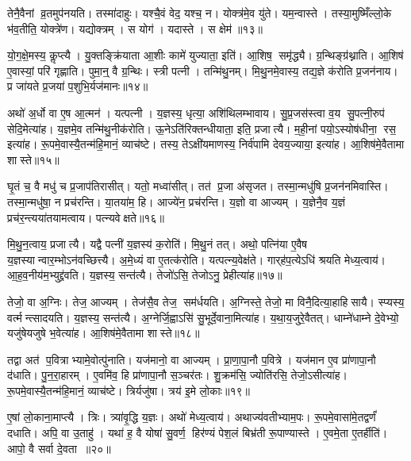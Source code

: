 तेनै॒वैनां व्र॒तमुप॑नयति।
तस्मा॑दाहुः।
यश्चै॒वं वेद॒ यश्च॒ न।
योक्त्र॑मे॒व यु॑ते।
यम॒न्वास्ते।
तस्या॒मुष्मिँल्लो॒के भ॑व॒तीति॒ योक्त्रे॑ण।
यद्योक्त्रम्।
स योग॑।
यदास्ते।
स क्षेम॑॥१३॥

यो॒ग॒क्षे॒मस्य॒ कॢप्त्यै।
यु॒क्तङ्क्रि॑याता आ॒शीः कामे॑ युज्याता॒ इति॑।
आ॒शिष॒ समृ॑द्ध्यै।
ग्र॒न्थिङ्ग्र॑थ्नाति।
आ॒शिष॑ ए॒वास्यां॒ परि॑ गृह्णाति।
पुमा॒न्॒ वै ग्र॒न्थिः।
स्त्री पत्नी।
तन्मि॑थु॒नम्।
मि॒थु॒नमे॒वास्य॒ तद्य॒ज्ञे क॑रोति प्र॒जन॑नाय।
प्र जा॑यते प्र॒जया॑ प॒शुभि॒र्यज॑मानः॥१४॥

अथो॑ अ॒र्धो वा ए॒ष आ॒त्मन॑।
यत्पत्नी।
य॒ज्ञस्य॒ धृत्या॒ अशि॑थिलम्भावाय।
सु॒प्र॒जस॑स्त्वा व॒य सु॒पत्नी॒रुप॑ सेदि॒मेत्या॑ह।
य॒ज्ञमे॒व तन्मि॑थु॒नीक॑रोति।
ऊ॒नेऽति॑रिक्तन्धीयाता॒ इति॒ प्रजात्यै।
म॒ही॒नां पयो॒ऽस्योष॑धीना॒ रस॒ इत्या॑ह।
रू॒पमे॒वास्यै॒तन्म॑हि॒मानं॒ व्याच॑ष्टे।
तस्य॒ तेऽक्षी॑यमाणस्य॒ निर्व॑पामि देवय॒ज्याया॒ इत्या॑ह।
आ॒शिष॑मे॒वैतामा शास्ते॥१५॥\anuvakamend[क॒रोति॑ व्रतोप॒नय॑नं॒ क्षेमो॒ यज॑मानः शास्ते]

घृ॒तं च॒ वै मधु॑ च प्र॒जाप॑तिरासीत्।
यतो॒ मध्वा॑सीत्।
तत॑ प्र॒जा अ॑सृजत।
तस्मा॒न्मधु॑षि प्र॒जन॑नमिवास्ति।
तस्मा॒न्मधु॑षा॒ न प्रच॑रन्ति।
या॒तया॑म॒ हि।
आज्ये॑न॒ प्रच॑रन्ति।
य॒ज्ञो वा आज्यम्।
य॒ज्ञेनै॒व य॒ज्ञं प्रच॑र॒न्त्यया॑तयामत्वाय।
पत्न्यवेक्षते॥१६॥

मि॒थु॒न॒त्वाय॒ प्रजात्यै।
यद्वै पत्नी॑ य॒ज्ञस्य॑ क॒रोति॑।
मि॒थु॒नं तत्।
अथो॒ पत्नि॑या ए॒वैष य॒ज्ञस्यान्वार॒म्भोऽन॑वच्छित्त्यै।
अ॒मे॒ध्यं वा ए॒तत्क॑रोति।
यत्पत्न्य॒वेक्ष॑ते।
गार्‌ह॑प॒त्येऽधि॑ श्रयति मेध्य॒त्वाय॑।
आ॒ह॒व॒नीय॑म॒भ्युद्द्र॑वति।
य॒ज्ञस्य॒ सन्त॑त्यै।
तेजो॑ऽसि॒ तेजोऽनु॒ प्रेहीत्या॑ह॥१७॥

तेजो॒ वा अ॒ग्निः।
तेज॒ आज्यम्।
तेज॑सै॒व तेज॒ सम॑र्धयति।
अ॒ग्निस्ते॒ तेजो॒ मा विनै॒दित्या॒हाहिसायै।
स्प्यस्य॒ वर्त्मन्त्सादयति।
य॒ज्ञस्य॒ सन्त॑त्यै।
अ॒ग्नेर्जि॒ह्वाऽसि॑ सु॒भूर्दे॒वाना॒मित्या॑ह।
य॒था॒य॒जुरे॒वैतत्।
धाम्ने॑धाम्ने दे॒वेभ्यो॒ यजु॑षेयजुषे भ॒वेत्या॑ह।
आ॒शिष॑मे॒वैतामा शास्ते॥१८॥

तद्वा अत॑ प॒वित्राभ्यामे॒वोत्पु॑नाति।
यज॑मानो॒ वा आज्यम्।
प्रा॒णा॒पा॒नौ प॒वित्रे।
यज॑मान ए॒व प्रा॑णापा॒नौ द॑धाति।
पु॒न॒रा॒हारम्।
ए॒वमि॑व॒ हि प्रा॑णापा॒नौ स॒ञ्चर॑तः।
शु॒क्रम॑सि॒ ज्योति॑रसि॒ तेजो॒ऽसीत्या॑ह।
रू॒पमे॒वास्यै॒तन्म॑हि॒मानं॒ व्याच॑ष्टे।
त्रिर्यजु॑षा।
त्रय॑ इ॒मे लो॒काः॥१९॥

ए॒षां लो॒काना॒माप्त्यै।
त्रिः।
त्र्या॑वृ॒द्धि य॒ज्ञः।
अथो॑ मेध्य॒त्वाय॑।
अथाज्य॑वतीभ्याम॒पः।
रू॒पमे॒वासा॑मे॒तद्वर्णं॑ दधाति।
अपि॒ वा उ॒ताहु॑।
यथा॑ ह॒ वै योषा॑ सु॒वर्ण॒ हिर॑ण्यं पेश॒लं बिभ्र॑ती रू॒पाण्यास्ते।
ए॒वमे॒ता ए॒तर्\mbox{}हीति॑।
आपो॒ वै सर्वा दे॒वता॥२०॥

